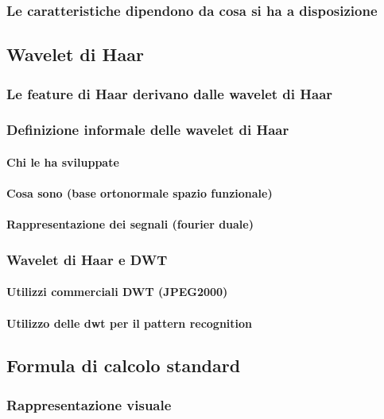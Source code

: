            \subsubsection{Le caratteristiche dipendono da cosa si ha a disposizione}
        \subsection{Wavelet di Haar}
            \subsubsection{Le feature di Haar derivano dalle wavelet di Haar}
            \subsubsection{Definizione informale delle wavelet di Haar}
                \paragraph{Chi le ha sviluppate}
                \paragraph{Cosa sono (base ortonormale spazio funzionale)}
                \paragraph{Rappresentazione dei segnali (fourier duale)}
            \subsubsection{Wavelet di Haar e DWT}
                \paragraph{Utilizzi commerciali DWT (JPEG2000)}
                \paragraph{Utilizzo delle dwt per il pattern recognition}
        \subsection{Formula di calcolo standard}
            \subsubsection{Rappresentazione visuale}
